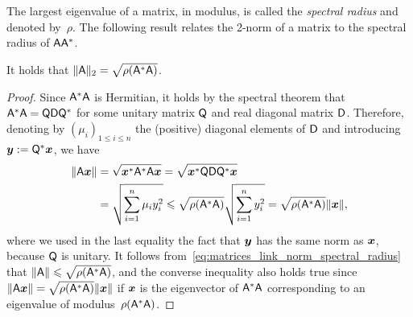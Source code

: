 The largest eigenvalue of a matrix, in modulus,
is called the \emph{spectral radius} and denoted by~$\rho$.
The following result relates the 2-norm of a matrix to the spectral radius of $\mathsf A \mathsf A^*$.
\begin{proposition}
    It holds that $\lVert\mathsf A\rVert_2 = \sqrt{\rho(\mathsf A^* \mathsf A)}$.
\end{proposition}
\begin{proof}
    Since $\mathsf A^* \mathsf A$ is Hermitian,
    it holds by the spectral theorem that $\mathsf A^* \mathsf A = \mathsf Q \mathsf D \mathsf Q^*$ for some unitary matrix $\mathsf Q$ and real diagonal matrix $\mathsf D$.
    Therefore, denoting by $(\mu_i)_{1 \leq i \leq n}$ the (positive) diagonal elements of $\mathsf D$
    and introducing $\mathbf{\boldsymbol{y}} := \mathsf Q^* \mathbf{\boldsymbol{x}}$,
    we have
    \begin{align}
        \nonumber
        \lVert\mathsf A \mathbf{\boldsymbol{x}}\rVert
        &= \sqrt{\mathbf{\boldsymbol{x}}^* \mathsf A^* \mathsf A \mathbf{\boldsymbol{x}}}
        = \sqrt{\mathbf{\boldsymbol{x}}^* \mathsf Q \mathsf D \mathsf Q^* \mathbf{\boldsymbol{x}}} \\
        \label{eq:matrices_link_norm_spectral_radius}
        &= \sqrt{\sum_{i=1}^{n} \mu_i y_i^2}
        \leqslant \sqrt{\rho(\mathsf A^* \mathsf A)} \sqrt{\sum_{i=1}^{n} y_i^2}
        =  \sqrt{\rho(\mathsf A^* \mathsf A)} \lVert\mathbf{\boldsymbol{x}}\rVert,
    \end{align}
    where we used in the last equality the fact that $\mathbf{\boldsymbol{y}}$ has the same norm as $\mathbf{\boldsymbol{x}}$,
    because $\mathsf Q$ is unitary.
    It follows from~\eqref{eq:matrices_link_norm_spectral_radius} that $\lVert\mathsf A\rVert \leqslant \sqrt{\rho(\mathsf A^* \mathsf A)}$,
    and the converse inequality also holds true since $\lVert\mathsf A \mathbf{\boldsymbol{x}}\rVert = \sqrt{\rho(\mathsf A^* \mathsf A)} \lVert\mathbf{\boldsymbol{x}}\rVert$
    if $\mathbf{\boldsymbol{x}}$ is the eigenvector of $\mathsf A^* \mathsf A$ corresponding to an eigenvalue of modulus~$\rho(\mathsf A^* \mathsf A)$.
\end{proof}

